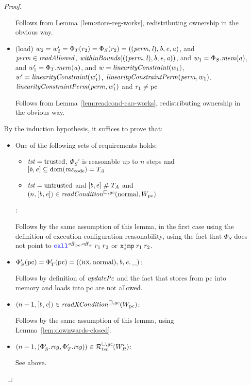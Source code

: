 \begin{proof}
\begin{itemize}
    Follows from Lemma~\ref{lem:store-reg-works}, redistributing ownership in the obvious way.

  \item (load) $w_2 = w_2' = \Phi_T(r_2) = \Phi_S(r_2) =
    ((\mathit{perm},\mathit{l}),\mathit{b},\mathit{e},\mathit{a})$, and $\perm \in \readAllowed{}$,
    $\withinBounds{((\perm,\lin),\baddr,\eaddr,\aaddr)}$, and
    $w_1 = \Phi_S.\mathit{mem}(\mathit{a})$, and $w_1' = \Phi_T.\mathit{mem}(\mathit{a})$, and
    $w = \linCons{w_1}$, $w' = \linCons{w_1'}$, $\linConsPerm{\perm}{w_1}$, $\linConsPerm{\perm}{w_1'}$ and $r_1 \neq \mathrm{pc}$

    Follows from Lemma~\ref{lem:readcond-cap-works}, redistributing ownership in the obvious way.

  \end{itemize}

  By the induction hypothesis, it suffices to prove that:
  \begin{itemize}
  \item One of the following sets of requirements holds:
    \begin{itemize}
    \item $\mathit{tst} = \mathrm{trusted}$, $\Phi_S'$ is reasonable up to $n$ steps and $[\baddr,\eaddr] \subseteq \dom(\mscode) = \ta$
    \item $\mathit{tst} = \mathrm{untrusted}$ and $[b,e] \mathrel{\#} T_{A}$ and $\npair{[\baddr,\eaddr]} \in \readCond{\normal,W_\pcreg}$
    \end{itemize}:

    Follows by the same assumption of this lemma, in the first case using the definition of execution configuration reasonability, using the fact that $\Phi_S$ does not point to $\scall{\offpc,\offsigma}{r_1}{r_2}$ or $\txjmp{r_1}{r_2}$.

  \item $\Phi_S'(\mathrm{pc}) = \Phi_T'(\mathrm{pc}) = ((\textsc{rx},\mathrm{normal}),\mathit{b},\mathit{e},\_)$:

    Follows by definition of $\updPcAddr{}$ and the fact that stores from pc into memory and loads into pc are not allowed.

  \item $\npair[n-1]{[\baddr,\eaddr]} \in \xReadCond{W_\pcreg}$:

    Follows by the same assumption of this lemma, using Lemma~\ref{lem:downwards-closed}.

  \item $\npair[n-1]{(\Phi_S'.\reg,\Phi_T'.\reg)} \in \lrrg{\trust}(W_R')$:

    See above.


\end{itemize}
\end{proof}
